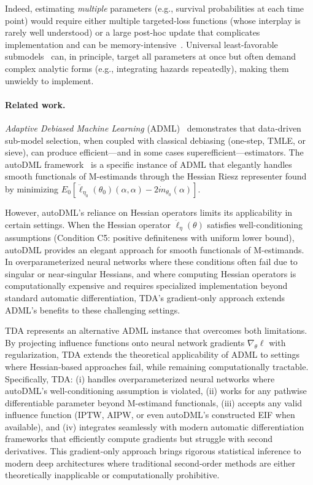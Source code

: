 \documentclass{article}
\theoremstyle{remark}
\begin{document}
Indeed, estimating \emph{multiple} parameters (e.g., survival probabilities at each time point) would require either multiple targeted-loss functions (whose interplay is rarely well understood) or a large post-hoc update that complicates implementation and can be memory-intensive~\cite{rytgaard2024one}. Universal least-favorable submodels~\cite{van2018targeted} can, in principle, target all parameters at once but often demand complex analytic forms (e.g., integrating hazards repeatedly), making them unwieldy to implement.

\paragraph{Related work.}
\emph{Adaptive Debiased Machine Learning} (ADML)~\cite{van2023adaptive} demonstrates that data‐driven sub-model selection, when coupled with classical debiasing (one-step, TMLE, or sieve), can produce efficient—and in some cases superefficient—estimators. The autoDML framework~\cite{van2025automatic} is a specific instance of ADML that elegantly handles smooth functionals of M-estimands through the Hessian Riesz representer found by minimizing $E_0[\ddot{\ell}_{\eta_0}(\theta_0)(\alpha, \alpha) - 2\dot{m}_{\theta_0}(\alpha)]$. 


However, autoDML's reliance on Hessian operators limits its applicability in certain settings. When the Hessian operator $\ddot{\ell}_{\eta}(\theta)$ satisfies well-conditioning assumptions (Condition C5: positive definiteness with uniform lower bound), autoDML provides an elegant approach for smooth functionals of M-estimands. In overparameterized neural networks where these conditions often fail due to singular or near-singular Hessians, and where computing Hessian operators is computationally expensive and requires specialized implementation beyond standard automatic differentiation, TDA's gradient-only approach extends ADML's benefits to these challenging settings.

TDA represents an alternative ADML instance that overcomes both limitations. By projecting influence functions onto neural network gradients $\nabla_{\theta}\ell$ with regularization, TDA extends the theoretical applicability of ADML to settings where Hessian-based approaches fail, while remaining computationally tractable. Specifically, TDA: (i) handles overparameterized neural networks where autoDML's well-conditioning assumption is violated, (ii) works for any pathwise differentiable parameter beyond M-estimand functionals, (iii) accepts any valid influence function (IPTW, AIPW, or even autoDML's constructed EIF when available), and (iv) integrates seamlessly with modern automatic differentiation frameworks that efficiently compute gradients but struggle with second derivatives. This gradient-only approach brings rigorous statistical inference to modern deep architectures where traditional second-order methods are either theoretically inapplicable or computationally prohibitive.
\end{document}
